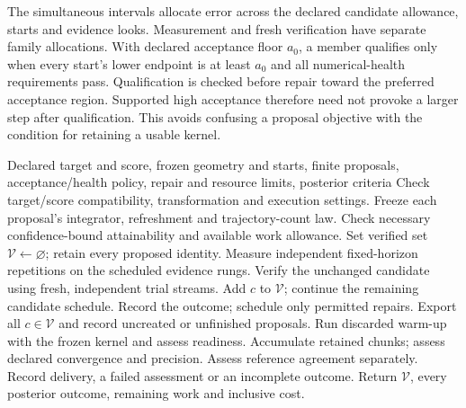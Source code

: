The simultaneous intervals allocate error across the declared candidate
allowance, starts and evidence looks. Measurement and fresh verification
have separate family allocations. With declared acceptance floor $a_0$,
a member qualifies only when every start's lower endpoint is at least
$a_0$ and all numerical-health requirements pass. Qualification is checked
before repair toward the preferred acceptance region. Supported high
acceptance therefore need not provoke a larger step after qualification.
This avoids confusing a proposal objective with the condition for retaining
a usable kernel.

\begin{algorithm}[htbp]
\caption{Experimental fixed-horizon tuning with separate posterior assessment}
\label{alg:bf-modern-candidate-procedure}
\begin{algorithmic}[1]
\Require Declared target and score, frozen geometry and starts, finite proposals,
acceptance/health policy, repair and resource limits, posterior criteria
\State Check target/score compatibility, transformation and execution settings.
\State Freeze each proposal's integrator, refreshment and trajectory-count law.
\State Check necessary confidence-bound attainability and available work allowance.
\State Set verified set $\mathcal V\gets\varnothing$; retain every proposed identity.
  \State Measure independent fixed-horizon repetitions on the scheduled evidence rungs.
    \State Verify the unchanged candidate using fresh, independent trial streams.
      \State Add $c$ to $\mathcal V$; continue the remaining candidate schedule.
    \EndIf
  \EndIf
  \State Record the outcome; schedule only permitted repairs.
\EndFor
\State Export all $c\in\mathcal V$ and record uncreated or unfinished proposals.
  \State Run discarded warm-up with the frozen kernel and assess readiness.
    \State Accumulate retained chunks; assess declared convergence and precision.
    \State Assess reference agreement separately.
  \EndIf
  \State Record delivery, a failed assessment or an incomplete outcome.
\EndFor
\State Return $\mathcal V$, every posterior outcome, remaining work and inclusive cost.
\end{algorithmic}
\end{algorithm}

